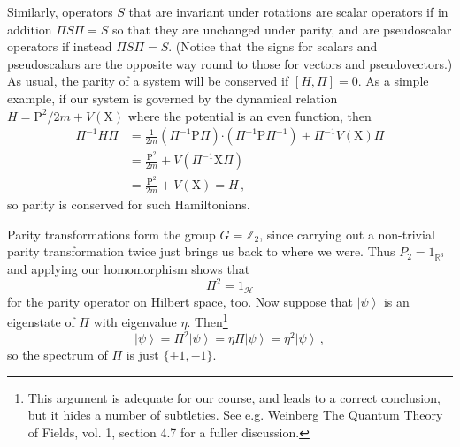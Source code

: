 \documentclass{article}
\theoremstyle{plain}\theoremheaderfont{\normalfont\itshape}\theorembodyfont{\rmfamily}\theoremseparator{.}\newtheorem*{rem}{Remark}\newtheorem*{ex}{Example}\newtheorem*{proof}{Proof}\newtheorem*{altp}{Alternative proof}
\theoremstyle{plain}\theoremheaderfont{\normalfont\bfseries}\theorembodyfont{\rmfamily}\theoremseparator{.}\newtheorem{thm}{Theorem}[section]\newtheorem{lem}[thm]{Lemma}\newtheorem{prop}[thm]{Proposition}\newtheorem*{cor}{Corollary}\newtheorem{defn}[thm]{Definition}\newtheorem{clm}[thm]{Claim}\newtheorem{clminproof}{Claim}
\theoremstyle{break}\theoremheaderfont{\normalfont\itshape}\theorembodyfont{\rmfamily}\theoremseparator{.\medskip}\newtheorem*{proofskip}{Proof}\newtheorem*{exs}{Examples}\newtheorem*{rems}{Remarks}
\theoremstyle{break}\theoremheaderfont{\normalfont\bfseries}\theorembodyfont{\rmfamily}\theoremseparator{.\medskip}\newtheorem{lemskip}[thm]{Lemma}\newtheorem{defnskip}[thm]{Definition}\newtheorem{propskip}[thm]{Proposition}\newtheorem{thmskip}[thm]{Theorem}
\numberwithin{equation}{section}
\newcommand{\ket}[1]{\left| #1 \right\rangle}
\newcommand{\vb}[1]{\bm{\mathrm{#1}}}
\newcommand{\vdot}{\bm{\cdot}}
\newcommand{\hb}{\mathcal{H}}
\newcommand{\ZZ}{\mathbb{Z}}
\newcommand{\RR}{\mathbb{R}}
\begin{document}
    Similarly, operators \(S\) that are invariant under rotations are scalar operators if in addition \(\Pi S\Pi=S\) so that they are unchanged under parity, and are pseudoscalar operators if instead \(\Pi S\Pi= S\). (Notice that the signs for scalars and pseudoscalars are the opposite way round to those for vectors and pseudovectors.) As usual, the parity of a system will be conserved if \([H,\Pi]=0\). As a simple example, if our system is governed by the dynamical relation \(H=\vb{P}^2/2m +V(\vb{X})\) where the potential is an even function, then
    \begin{align}
        \Pi^{-1}H\Pi&=\frac{1}{2m}(\Pi^{-1}\vb{P}\Pi)\vdot(\Pi^{-1}\vb{P}\Pi^{-1})+\Pi^{-1}V(\vb{X})\Pi\\
        &=\frac{\vb{P}^2}{2m}+V(\Pi^{-1}\vb{X}\Pi)\\
        &=\frac{\vb{P}^2}{2m}+V(\vb{X})=H\,,
    \end{align}
    so parity is conserved for such Hamiltonians.

    Parity transformations form the group \(G=\ZZ_2\), since carrying out a non-trivial parity transformation twice just brings us back to where we were. Thus \(P_2=1_{\RR^3}\) and applying our homomorphism shows that
    \begin{equation}
        \Pi^2=1_{\hb}
    \end{equation}
    for the parity operator on Hilbert space, too. Now suppose that \(\ket{\psi}\) is an eigenstate of \(\Pi\) with eigenvalue \(\eta\). Then\footnote{This argument is adequate for our course, and leads to a correct conclusion, but it hides a number of subtleties. See e.g. Weinberg The Quantum Theory of Fields, vol. 1, section 4.7 for a fuller discussion.}
    \begin{equation}
        \ket{\psi}=\Pi^2\ket{\psi}=\eta\Pi\ket{\psi}=\eta^2\ket{\psi}\,,
    \end{equation}
    so the spectrum of \(\Pi\) is just \(\{+1,-1\}\).
\end{document}
